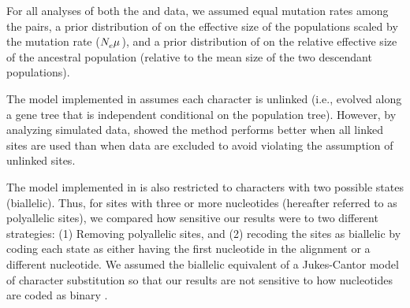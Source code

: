 For all analyses of both the  and  data, we
assumed equal mutation rates among the pairs, a prior distribution of
 on the effective  size of the populations scaled
by the mutation rate ($N_{e}^{}{}\mu_{}{}$), and a
prior distribution of  on the relative effective size of the
ancestral population (relative to the mean size of the two descendant
populations).

The model implemented in \ecoevolity assumes each character is unlinked (i.e.,
evolved along a gene tree that is independent conditional on the population
tree).
However, by analyzing simulated data, \citet{Oaks2018ecoevolity} showed
the method performs better when all linked sites are used than when data are
excluded to avoid violating the assumption of unlinked sites.

The model implemented in \ecoevolity is also restricted to characters with two
possible states (biallelic).
Thus, for sites with three or more nucleotides (hereafter referred to as
polyallelic sites), we compared how sensitive our
results were to two different strategies:
(1) Removing polyallelic sites, and
(2) recoding the sites as biallelic by coding each state as either having the
first nucleotide in the alignment or a different nucleotide.
We assumed the biallelic equivalent of a Jukes-Cantor model of character
substitution \citep{JC1969} so that our results are not sensitive to how
nucleotides are coded as binary
\citep{Oaks2018ecoevolity}.

